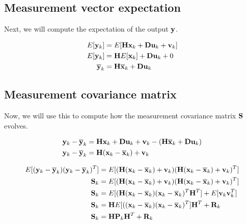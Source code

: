 \subsection{Measurement vector expectation}

Next, we will compute the expectation of the output $\mathbf{y}$.

\begin{align*}
  E[\mathbf{y}_k] &= E[\mathbf{H}\mathbf{x}_k + \mathbf{D}\mathbf{u}_k + \mathbf{v}_k] \\
  E[\mathbf{y}_k] &= \mathbf{H}E[\mathbf{x}_k] + \mathbf{D}\mathbf{u}_k + 0 \\
  \overline{\mathbf{y}}_k &= \mathbf{H}\overline{\mathbf{x}}_k + \mathbf{D}\mathbf{u}_k
\end{align*}

\subsection{Measurement covariance matrix}

Now, we will use this to compute how the measurement covariance matrix
$\mathbf{S}$ evolves.

\begin{align*}
  \mathbf{y}_k - \overline{\mathbf{y}}_k &= \mathbf{H}\mathbf{x}_k + \mathbf{D}\mathbf{u}_k + \mathbf{v}_k -
    (\mathbf{H}\overline{\mathbf{x}}_k + \mathbf{D}\mathbf{u}_k) \\
  \mathbf{y}_k - \overline{\mathbf{y}}_k &= \mathbf{H}(\mathbf{x}_k - \overline{\mathbf{x}}_k) + \mathbf{v}_k
\end{align*}

\begin{align*}
  E[(\mathbf{y}_k - \overline{\mathbf{y}}_k)(\mathbf{y}_k - \overline{\mathbf{y}}_k)^T] &=
    E[(\mathbf{H}(\mathbf{x}_k - \overline{\mathbf{x}}_k) + \mathbf{v}_k)
      (\mathbf{H}(\mathbf{x}_k - \overline{\mathbf{x}}_k) + \mathbf{v}_k)^T] \\
  \mathbf{S}_k &= E[(\mathbf{H}(\mathbf{x}_k - \overline{\mathbf{x}}_k) + \mathbf{v}_k)
                 (\mathbf{H}(\mathbf{x}_k - \overline{\mathbf{x}}_k) + \mathbf{v}_k)^T] \\
  \mathbf{S}_k &= E[(\mathbf{H}(\mathbf{x}_k - \overline{\mathbf{x}}_k)
                 (\mathbf{x}_k - \overline{\mathbf{x}}_k)^T\mathbf{H}^T] +
               E[\mathbf{v}_k\mathbf{v}_k^T] \\
  \mathbf{S}_k &=
    \mathbf{H}E[((\mathbf{x}_k - \overline{\mathbf{x}}_k)(\mathbf{x}_k - \overline{\mathbf{x}}_k)^T]
    \mathbf{H}^T + \mathbf{R}_k \\
  \mathbf{S}_k &= \mathbf{H}\mathbf{P}_k\mathbf{H}^T + \mathbf{R}_k
\end{align*}
